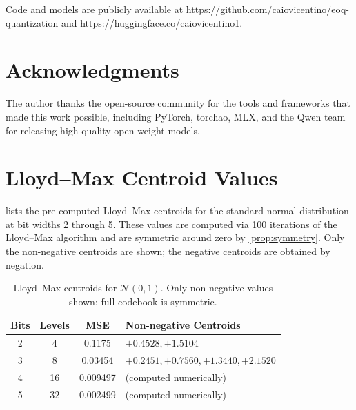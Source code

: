\documentclass[10pt,twocolumn]{article}
\begin{document}
Code and models are publicly available at \url{https://github.com/caiovicentino/eoq-quantization} and \url{https://huggingface.co/caiovicentino1}.

\section*{Acknowledgments}

The author thanks the open-source community for the tools and frameworks that made this work possible, including PyTorch, torchao, MLX, and the Qwen team for releasing high-quality open-weight models.




\clearpage
\onecolumn
\appendix

\section{Lloyd--Max Centroid Values}
\label{app:centroids}

 lists the pre-computed Lloyd--Max centroids for the standard normal distribution at bit widths 2 through 5. These values are computed via 100 iterations of the Lloyd--Max algorithm and are symmetric around zero by \cref{prop:symmetry}. Only the non-negative centroids are shown; the negative centroids are obtained by negation.

\begin{table}[h]
\centering
\caption{Lloyd--Max centroids for $\mathcal{N}(0,1)$. Only non-negative values shown; full codebook is symmetric.}
\label{tab:centroids}
\small
\begin{tabular}{@{}cccl@{}}
\toprule
\textbf{Bits} & \textbf{Levels} & \textbf{MSE} & \textbf{Non-negative Centroids} \\
\midrule
2 & 4 & 0.1175 & $+0.4528, +1.5104$ \\
3 & 8 & 0.03454 & $+0.2451, +0.7560, +1.3440, +2.1520$ \\
4 & 16 & 0.009497 & (computed numerically) \\
5 & 32 & 0.002499 & (computed numerically) \\
\bottomrule
\end{tabular}
\end{table}
\end{document}
